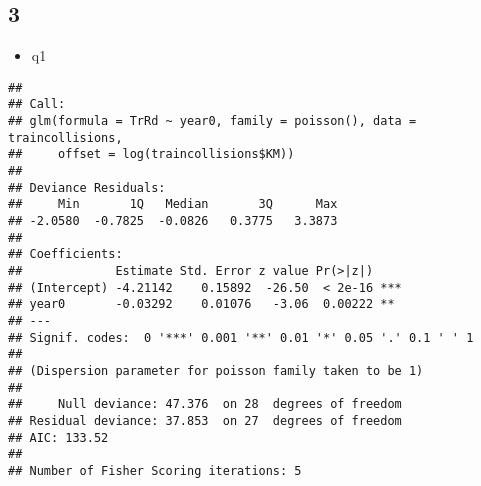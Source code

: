 \documentclass[12pt,hyperref,]{ctexart}
\newenvironment{Shaded}{\begin{snugshade}}{\end{snugshade}}
\newcommand{\DataTypeTok}[1]{\textcolor[rgb]{0.13,0.29,0.53}{#1}}
\newcommand{\DecValTok}[1]{\textcolor[rgb]{0.00,0.00,0.81}{#1}}
\newcommand{\KeywordTok}[1]{\textcolor[rgb]{0.13,0.29,0.53}{\textbf{#1}}}
\newcommand{\NormalTok}[1]{#1}
\newcommand{\OperatorTok}[1]{\textcolor[rgb]{0.81,0.36,0.00}{\textbf{#1}}}
\newcommand{\StringTok}[1]{\textcolor[rgb]{0.31,0.60,0.02}{#1}}
\providecommand{\tightlist}{%
  \setlength{\itemsep}{0pt}\setlength{\parskip}{0pt}}
\begin{document}
\hypertarget{section}{%
\subsection{3}\label{section}}

\begin{itemize}
\tightlist
\item
  q1
\end{itemize}

\begin{Shaded}
\end{Shaded}

\begin{verbatim}
## 
## Call:
## glm(formula = TrRd ~ year0, family = poisson(), data = traincollisions, 
##     offset = log(traincollisions$KM))
## 
## Deviance Residuals: 
##     Min       1Q   Median       3Q      Max  
## -2.0580  -0.7825  -0.0826   0.3775   3.3873  
## 
## Coefficients:
##             Estimate Std. Error z value Pr(>|z|)    
## (Intercept) -4.21142    0.15892  -26.50  < 2e-16 ***
## year0       -0.03292    0.01076   -3.06  0.00222 ** 
## ---
## Signif. codes:  0 '***' 0.001 '**' 0.01 '*' 0.05 '.' 0.1 ' ' 1
## 
## (Dispersion parameter for poisson family taken to be 1)
## 
##     Null deviance: 47.376  on 28  degrees of freedom
## Residual deviance: 37.853  on 27  degrees of freedom
## AIC: 133.52
## 
## Number of Fisher Scoring iterations: 5
\end{verbatim}

\begin{Shaded}
\end{Shaded}
\end{document}

